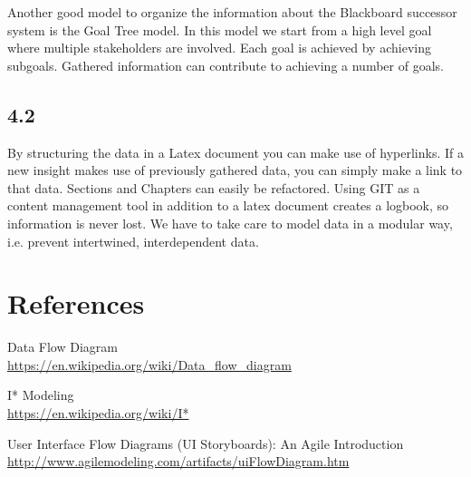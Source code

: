 Another good model to organize the information about the Blackboard successor system is the Goal Tree model. In this model we start from a high level goal where multiple stakeholders are involved. Each goal is achieved by achieving subgoals. Gathered information can contribute to achieving a number of goals.

\section*{4.2}
By structuring the data in a Latex document you can make use of hyperlinks. If a new insight makes use of previously gathered data, you can simply make a link to that data. Sections and Chapters can easily be refactored. Using GIT as a content management tool in addition to a latex document creates a logbook, so information is never lost. We have to take care to model data in a modular way, i.e. prevent intertwined, interdependent data. 

\chapter{References}

\begin{thebibliography}{9}
		
	Data Flow Diagram \\
	\url{https://en.wikipedia.org/wiki/Data_flow_diagram}
	
	I* Modeling \\
	\url{https://en.wikipedia.org/wiki/I*}
	
	User Interface Flow Diagrams (UI Storyboards): An Agile Introduction \\
	\url{http://www.agilemodeling.com/artifacts/uiFlowDiagram.htm}
	
	
\end{thebibliography}


\appendix



